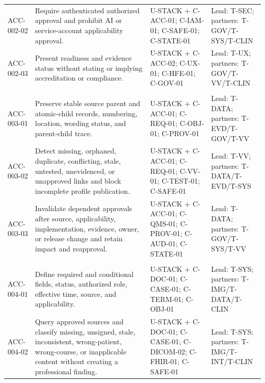 \documentclass[11pt,letterpaper]{article}
\begin{document}
\begin{scriptsize}
\begin{longtable}{@{}L{0.14\textwidth}L{0.39\textwidth}L{0.25\textwidth}L{0.16\textwidth}@{}}
\mbox{ACC-002-02} & Require authenticated authorized approval and prohibit AI or service-account applicability approval. & U-STACK + C-ACC-01; C-IAM-01; C-SAFE-01; C-STATE-01 & Lead: T-SEC; partners: T-GOV\slash\allowbreak{}T-SYS\slash\allowbreak{}T-CLIN \\
\addlinespace[2pt]
\mbox{ACC-002-03} & Present readiness and evidence status without stating or implying accreditation or compliance. & U-STACK + C-ACC-02; C-UX-01; C-HFE-01; C-GOV-01 & Lead: T-UX; partners: T-GOV\slash\allowbreak{}T-VV\slash\allowbreak{}T-CLIN \\
\addlinespace[2pt]
 \\
\addlinespace[2pt]
\mbox{ACC-003-01} & Preserve stable source parent and atomic-child records, numbering, location, wording status, and parent-child trace. & U-STACK + C-ACC-01; C-REQ-01; C-OBJ-01; C-PROV-01 & Lead: T-DATA; partners: T-EVD\slash\allowbreak{}T-GOV\slash\allowbreak{}T-VV \\
\addlinespace[2pt]
\mbox{ACC-003-02} & Detect missing, orphaned, duplicate, conflicting, stale, untested, unevidenced, or unapproved links and block incomplete profile publication. & U-STACK + C-ACC-01; C-REQ-01; C-VV-01; C-TEST-01; C-SAFE-01 & Lead: T-VV; partners: T-DATA\slash\allowbreak{}T-EVD\slash\allowbreak{}T-SYS \\
\addlinespace[2pt]
\mbox{ACC-003-03} & Invalidate dependent approvals after source, applicability, implementation, evidence, owner, or release change and retain impact and reapproval. & U-STACK + C-ACC-01; C-QMS-01; C-PROV-01; C-AUD-01; C-STATE-01 & Lead: T-DATA; partners: T-GOV\slash\allowbreak{}T-SYS\slash\allowbreak{}T-VV \\
\addlinespace[2pt]
 \\
\addlinespace[2pt]
\mbox{ACC-004-01} & Define required and conditional fields, status, authorized role, effective time, source, and applicability. & U-STACK + C-DOC-01; C-CASE-01; C-TERM-01; C-OBJ-01 & Lead: T-SYS; partners: T-IMG\slash\allowbreak{}T-DATA\slash\allowbreak{}T-CLIN \\
\addlinespace[2pt]
\mbox{ACC-004-02} & Query approved sources and classify missing, unsigned, stale, inconsistent, wrong-patient, wrong-course, or inapplicable content without creating a professional finding. & U-STACK + C-DOC-01; C-CASE-01; C-DICOM-02; C-FHIR-01; C-SAFE-01 & Lead: T-SYS; partners: T-IMG\slash\allowbreak{}T-INT\slash\allowbreak{}T-CLIN \\

\end{longtable}
\end{scriptsize}
\end{document}
